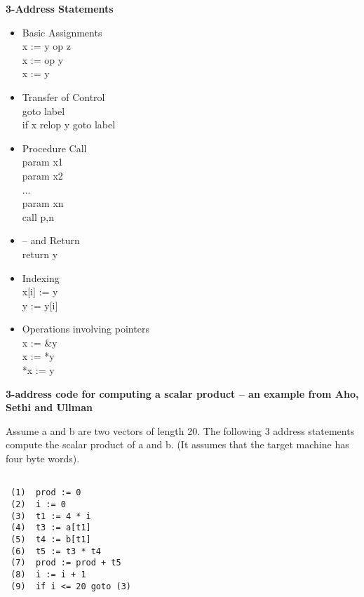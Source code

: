 %
%
\begin{slide}{}
{\bf 3-Address Statements}
{\small
\begin{itemize}
\item Basic Assignments\\
    x := y op z\\
    x := op y\\
    x := y
\item Transfer of Control\\
    goto label\\
    if x relop y goto label
\item Procedure Call\\
    param x1\\
    param x2\\
    ...\\
    param xn\\
    call p,n\\
\item -- and Return\\
    return y
\item Indexing\\
    x[i] := y\\
    y := y[i]
\item Operations involving pointers\\
    x := \&y\\
    x := *y\\
    *x := y
\end{itemize}
}
\end{slide}
%
%
\begin{slide}{}
{\bf 3-address code for computing a scalar product -- an
example from Aho, Sethi and Ullman}

Assume a and b are two vectors of length 20. The
following 3 address statements compute the scalar
product of a and b. (It assumes that the target machine
has four byte words).

\begin{verbatim}

 (1)  prod := 0
 (2)  i := 0
 (3)  t1 := 4 * i
 (4)  t3 := a[t1]
 (5)  t4 := b[t1]
 (6)  t5 := t3 * t4
 (7)  prod := prod + t5
 (8)  i := i + 1
 (9)  if i <= 20 goto (3)
\end{verbatim}

\end{slide}

